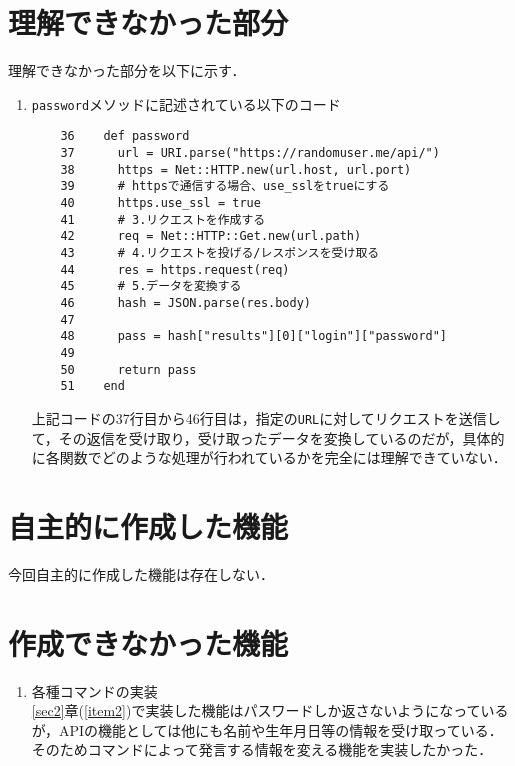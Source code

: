 \documentclass[12pt]{jsarticle}
\begin{document}
\section{理解できなかった部分}\label{sec3}
理解できなかった部分を以下に示す．
\begin{enumerate}
  \item \verb|password|メソッドに記述されている以下のコード
\begin{verbatim}
    36	  def password
    37	    url = URI.parse("https://randomuser.me/api/")
    38	    https = Net::HTTP.new(url.host, url.port)
    39	    # httpsで通信する場合、use_sslをtrueにする
    40	    https.use_ssl = true
    41	    # 3.リクエストを作成する
    42	    req = Net::HTTP::Get.new(url.path)
    43	    # 4.リクエストを投げる/レスポンスを受け取る
    44	    res = https.request(req)
    45	    # 5.データを変換する
    46	    hash = JSON.parse(res.body)
    47	
    48	    pass = hash["results"][0]["login"]["password"] 
    49	
    50	    return pass
    51	  end
\end{verbatim}
上記コードの37行目から46行目は，指定の\verb|URL|に対してリクエストを送信して，その返信を受け取り，受け取ったデータを変換しているのだが，具体的に各関数でどのような処理が行われているかを完全には理解できていない．
\end{enumerate}
   
\section{自主的に作成した機能}\label{sec4}
今回自主的に作成した機能は存在しない．

\section{作成できなかった機能}\label{sec5}
\begin{enumerate}
\item 各種コマンドの実装\\
  \ref{sec2}章(\ref{item2})で実装した機能はパスワードしか返さないようになっているが，APIの機能としては他にも名前や生年月日等の情報を受け取っている．そのためコマンドによって発言する情報を変える機能を実装したかった．
\end{enumerate}


\end{document}

